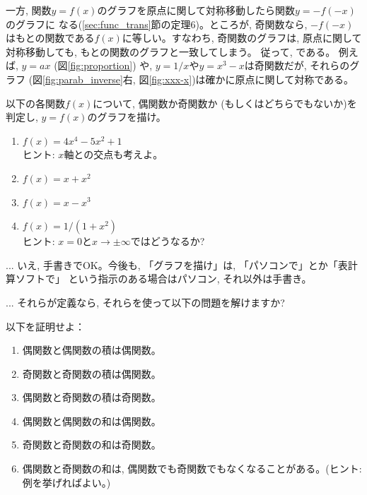 一方, 関数$y=f(x)$のグラフを原点に関して対称移動したら関数$y=-f(-x)$のグラフに
なる(\ref{sec:func_trans}節の定理6)。ところが, 奇関数なら, 
$-f(-x)$はもとの関数である$f(x)$に等しい。すなわち, 奇関数のグラフは, 
原点に関して対称移動しても, もとの関数のグラフと一致してしまう。
従って, である。
例えば, $y=ax$ (図\ref{fig:proportion})
や, $y=1/x$や$y=x^3-x$は奇関数だが, それらのグラフ (図\ref{fig:parab_inverse}右, 
図\ref{fig:xxx-x})は確かに原点に関して対称である。

\begin{q}\label{q:func_evenodd1} 以下の各関数$f(x)$について, 偶関数か奇関数か
(もしくはどちらでもないか)を判定し, $y=f(x)$のグラフを描け。
\begin{enumerate}
\item $f(x)=4x^4-5x^2+1$\\ ヒント: $x$軸との交点も考えよ。
\item $f(x)=x+x^2$
\item $f(x)=x-x^3$
\item $f(x)=1/(1+x^2)$\\ ヒント: $x=0$と$x\rightarrow \pm \infty$ではどうなるか? 
\end{enumerate}\end{q}

\begin{faq}{\small{}
... いえ, 手書きでOK。今後も, 「グラフを描け」は, 「パソコンで」とか「表計算ソフトで」
という指示のある場合はパソコン, それ以外は手書き。}\end{faq}

\begin{freqmiss}{\small{}
... それらが定義なら, それらを使って以下の問題を解けますか?}\end{freqmiss}

\begin{q}\label{q:func_evenodd2} 以下を証明せよ：
\begin{enumerate}
\item 偶関数と偶関数の積は偶関数。
\item 奇関数と奇関数の積は偶関数。
\item 偶関数と奇関数の積は奇関数。
\item 偶関数と偶関数の和は偶関数。
\item 奇関数と奇関数の和は奇関数。
\item 偶関数と奇関数の和は, 偶関数でも奇関数でもなくなることがある。(ヒント: 例を挙げればよい。)
\end{enumerate}\end{q}


